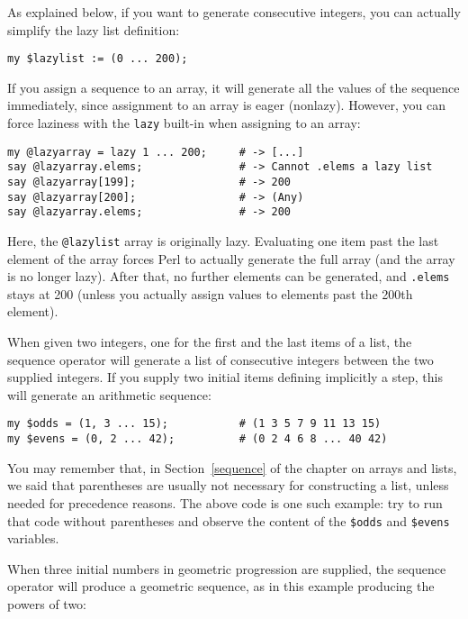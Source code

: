 As explained below, if you want to generate consecutive 
integers, you can actually simplify the lazy list definition:

\begin{verbatim}
my $lazylist := (0 ... 200);
\end{verbatim}


If you assign a sequence to an array, it will generate 
all the values of the sequence immediately, since 
assignment to an array is eager (nonlazy).  However, 
you can force laziness with the  {\tt lazy} built-in 
when assigning to an array:

\begin{verbatim}
my @lazyarray = lazy 1 ... 200;     # -> [...]
say @lazyarray.elems;               # -> Cannot .elems a lazy list
say @lazyarray[199];                # -> 200
say @lazyarray[200];                # -> (Any)
say @lazyarray.elems;               # -> 200
\end{verbatim}

Here, the \verb'@lazylist' array is originally lazy. 
Evaluating one item past the last element of the array 
forces Perl to actually generate the full array (and the 
array is no longer lazy). After that, no further elements 
can be generated, and {\tt .elems} stays at 200 (unless 
you actually assign values to elements past the 200th 
element).

When given two integers, one for the first and the last items of 
a list, the sequence operator will generate a list of consecutive 
integers between the two supplied integers. If you supply two 
initial items defining implicitly a step, this will generate 
an arithmetic sequence:

\begin{verbatim}
my $odds = (1, 3 ... 15);           # (1 3 5 7 9 11 13 15)
my $evens = (0, 2 ... 42);          # (0 2 4 6 8 ... 40 42)
\end{verbatim}

You may remember that, in Section~\ref{sequence} of the chapter 
on arrays and lists, we said that parentheses are usually not 
necessary for constructing a list, unless needed for 
precedence reasons. The above code is one such example: try 
to run that code without parentheses and observe the content 
of the \verb'$odds' and \verb'$evens' variables.

When three initial numbers in geometric progression are supplied, the 
sequence operator will produce a geometric sequence, as in 
this example producing the powers of two:

